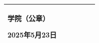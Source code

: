 \documentclass[a4paper,12pt]{article}
\begin{document}
\begin{tabular}{|p{1.2cm}|p{2.2cm}|p{1.2cm}|p{2.5cm}|p{1.5cm}|p{5.06cm}|}
{\hfill 学院（公章）\hspace{2cm}

\hfill 2025年5月23日\hspace{0.5cm}
\vspace{2pt}
} \\
\hline
\end{tabular}
\end{document}
